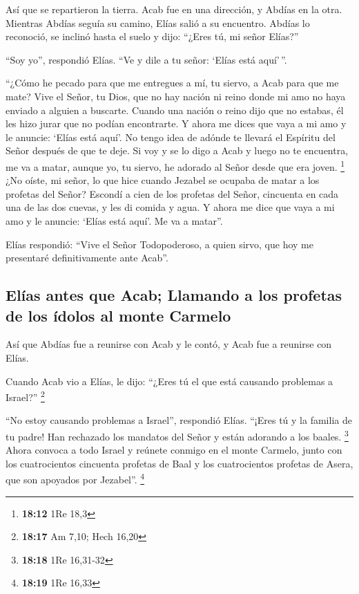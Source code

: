  Así que se repartieron la tierra. Acab fue en una
dirección, y Abdías en la otra.  Mientras Abdías seguía su
camino, Elías salió a su encuentro. Abdías lo reconoció, se inclinó
hasta el suelo y dijo: ``¿Eres tú, mi señor Elías?''

 ``Soy yo'', respondió Elías. ``Ve y dile a tu señor:
`Elías está aquí'\,''.

 ``¿Cómo he pecado para que me entregues a mí, tu siervo,
a Acab para que me mate?  Vive el Señor, tu Dios, que no
hay nación ni reino donde mi amo no haya enviado a alguien a buscarte.
Cuando una nación o reino dijo que no estabas, él les hizo jurar que no
podían encontrarte.  Y ahora me dices que vaya a mi amo y
le anuncie: `Elías está aquí'.  No tengo idea de adónde
te llevará el Espíritu del Señor después de que te deje. Si voy y se lo
digo a Acab y luego no te encuentra, me va a matar, aunque yo, tu
siervo, he adorado al Señor desde que era joven. \footnote{\textbf{18:12}
  1Re 18,3}  ¿No oíste, mi señor, lo que hice cuando
Jezabel se ocupaba de matar a los profetas del Señor? Escondí a cien de
los profetas del Señor, cincuenta en cada una de las dos cuevas, y les
di comida y agua.  Y ahora me dice que vaya a mi amo y le
anuncie: `Elías está aquí'. Me va a matar''.

 Elías respondió: ``Vive el Señor Todopoderoso, a quien
sirvo, que hoy me presentaré definitivamente ante Acab''.

\hypertarget{eluxedas-antes-que-acab-llamando-a-los-profetas-de-los-uxeddolos-al-monte-carmelo}{%
\subsection{Elías antes que Acab; Llamando a los profetas de los ídolos
al monte
Carmelo}\label{eluxedas-antes-que-acab-llamando-a-los-profetas-de-los-uxeddolos-al-monte-carmelo}}

 Así que Abdías fue a reunirse con Acab y le contó, y
Acab fue a reunirse con Elías.

 Cuando Acab vio a Elías, le dijo: ``¿Eres tú el que está
causando problemas a Israel?'' \footnote{\textbf{18:17} Am 7,10; Hech
  16,20}

 ``No estoy causando problemas a Israel'', respondió
Elías. ``¡Eres tú y la familia de tu padre! Han rechazado los mandatos
del Señor y están adorando a los baales. \footnote{\textbf{18:18} 1Re
  16,31-32}  Ahora convoca a todo Israel y reúnete
conmigo en el monte Carmelo, junto con los cuatrocientos cincuenta
profetas de Baal y los cuatrocientos profetas de Asera, que son apoyados
por Jezabel''. \footnote{\textbf{18:19} 1Re 16,33}

